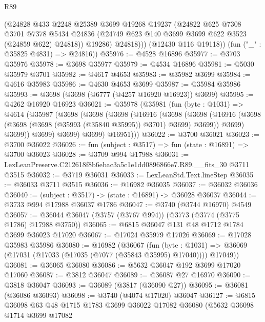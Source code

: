 \begin{lexlean}{R89}
\begin{coremodule}
              (@24828
                @433
                @2248
                @25389
                @3699
                @19268
                @19237
                (@24822
                  @625
                  @7308
                  @3701
                  @7378
                  @5434
                  @24836
                  (@24749 @623 @140 @3699 @3699 @622 @3523 (@24859 @622) @24818))
                @19286)
              @24818)))
        (@12430 @116 @19118))
      (fun ("_" : @35825 @4831) => @24816))
@35976 := @4528 @16896
@35977 := @3703 @35976
@35978 := @3698 @35977
@35979 := @4534 @16896
@35981 := @5030 @35979 @3701
@35982 := @4617 @4653
@35983 := @35982 @3699
@35984 := @4616 @35983
@35986 := @4630 @4653 @3699
@35987 := @35984 @35986
@35993 := @3698 (@3698 (@6777 (@4257 @16920 @16923)) @3699)
@35995 := @4262 @16920 @16923
@36021 := @35978
    (@35981
      (fun (byte : @1031) =>
      @4614
        (@35987
          (@3698
            (@3698
              (@3698
                (@16916
                  (@3698
                    (@3698
                      (@16916 (@3698 (@3698 (@3698 (@35993 (@35840 @35995)) @3701) @3699) @3699))
                      @3699)
                    @3699))
                @3699)
              @3699)
            @3699)
          @16951)))
@36022 := @3700 @36021
@36023 := @3700 @36022
@36026 := fun (subject : @3517) => fun (state : @16891) => @3700 @36023
@36028 := @3709 @994 @17988
@36031 := LexLeanPreserve.C212618f8b6ebac3a5c1e1dd0896866e7.R89.__fits_30 @3711 @3515
@36032 := @3719 @36031
@36033 := LexLeanStd.Text.lineStep
@36035 := @36033 @3711 @3515
@36036 := @16982 @36035
@36037 := @36032 @36036
@36040 := (subject : @3517) -> (state : @16891) -> @36028 @36037
@36044 := @3733 @994 @17988 @36037 @1786
@36047 := @3740 (@3744 @16970) @4549
@36057 := @36044 @36047 (@3757 (@3767 @994)) (@3773 (@3774 (@3775 @1786) @17988 @3750))
@36065 := @6815 @36047 @131 @48 @1712 @1784 @3699 @36023 @17020
@36067 := @17024 @35979 @17026
@36069 := @17028 @35983 @35986
@36080 := @16982
    (@36067
      (fun (byte : @1031) =>
      @36069 (@17031 (@17033 (@17035 (@7077 (@35843 @35995) @17040)))) @17049))
@36081 := @36065 @36080
@36086 := @5632 @36047 @192 @3699 @17020 @17060
@36087 := @3812 @36047
@36089 := @36087 @27 @16970
@36090 := @3818 @36047
@36093 := @36089 (@3817 (@36090 @27))
@36095 := @36081 (@36086 @36093)
@36098 := @3740 (@4074 @17020) @36047
@36127 := @6815
    @36098
    @63
    @48
    @1715
    @1783
    @3699
    @36022
    @17082
    @36080
    (@5632
      @36098
      @1714
      @3699
      @17082

\end{coremodule}
\end{lexlean}

